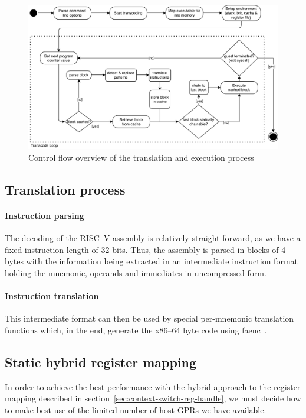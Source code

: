 \begin{figure}[h]
	\begin{center}
		\includegraphics[width=\textwidth]{media/strategy.pdf}
		\caption{Control flow overview of the translation and execution process}
		\label{fig:control-flow-chart}
	\end{center}
\end{figure}

\subsection{Translation process}
\paragraph{Instruction parsing} \mbox{}

The decoding of the RISC--V assembly is relatively straight-forward, as we have a fixed instruction length of 32 bits.
Thus, the assembly is parsed in blocks of 4 bytes with the information being extracted in an intermediate instruction format holding the mnemonic, operands and immediates in uncompressed form.

\paragraph{Instruction translation} \mbox{}

This intermediate format can then be used by special per-mnemonic translation functions which, in the end, generate the x86--64 byte code using faenc~\cite{faenc}.


\subsection{Static hybrid register mapping}
In order to achieve the best performance with the hybrid approach to the register mapping described in section~\vref{sec:context-switch-reg-handle}, we must decide how to make best use of the limited number of host GPRs we have available.


